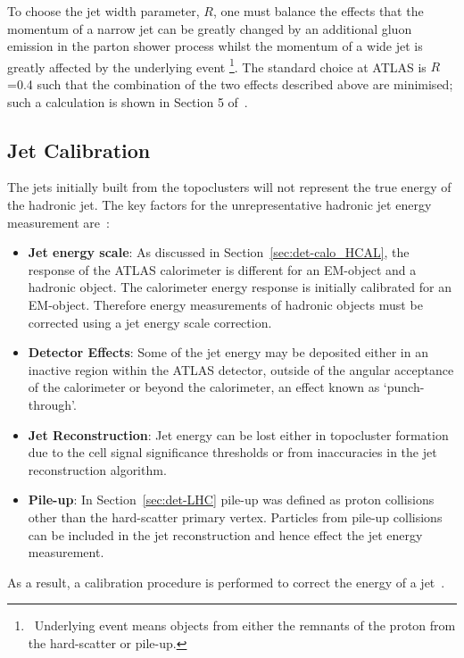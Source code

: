 To choose the jet width parameter, $R$, one must balance the effects that the
momentum of a narrow jet can be greatly changed by an additional gluon emission in the parton shower process
whilst the momentum of a wide jet is greatly affected by the underlying event \footnote{\  Underlying event means objects from either the remnants of the proton from the hard-scatter or pile-up.}.
The standard choice at ATLAS is $R$=0.4 such that the combination of the two effects described above are minimised;
such a calculation is shown in Section 5 of~\cite{obj-jets_reco_salam}.


\subsection{Jet Calibration}
\label{sec:obj-jets_calib}

The jets initially built from the topoclusters will not represent the true energy of the hadronic jet.
The key factors for the unrepresentative hadronic jet energy measurement are~\cite{det-thesis_kate,obj-jets_calib_2015}:
\begin{itemize}[leftmargin=*]
\item\textbf{Jet energy scale}:
  As discussed in Section~\ref{sec:det-calo_HCAL}, the response of the ATLAS calorimeter is different for an EM-object and a hadronic object.
  The calorimeter energy response is initially calibrated for an EM-object.
  Therefore energy measurements of hadronic objects must be corrected using a jet energy scale correction. \vspace{0.5em}
\item\textbf{Detector Effects}:
  Some of the jet energy may be deposited either in an inactive region within the ATLAS detector,
  outside of the angular acceptance of the calorimeter or beyond the calorimeter, an effect known as `punch-through'.\vspace{0.5em}
\item\textbf{Jet Reconstruction}:
  Jet energy can be lost either in topocluster formation due to the cell signal significance thresholds
  or from inaccuracies in the jet reconstruction algorithm.\vspace{0.5em}
\item\textbf{Pile-up}:
  In Section~\ref{sec:det-LHC} pile-up was defined as proton collisions other than the hard-scatter primary vertex.
  Particles from pile-up collisions can be included in the jet reconstruction and hence effect the jet energy measurement.
\end{itemize}
\vspace{-0.5em}
As a result, a calibration procedure is performed to correct the energy of a jet~\cite{obj-jets_calib_run2}.

